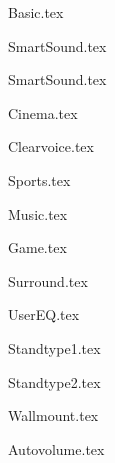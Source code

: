 {Basic.tex}

{SmartSound.tex}

{SmartSound.tex}


{Cinema.tex}

{Clearvoice.tex}

{Sports.tex}

{Music.tex}

{Game.tex}

{Surround.tex}


{UserEQ.tex}


{Standtype1.tex}

{Standtype2.tex}

{Wallmount.tex}


{Autovolume.tex}
